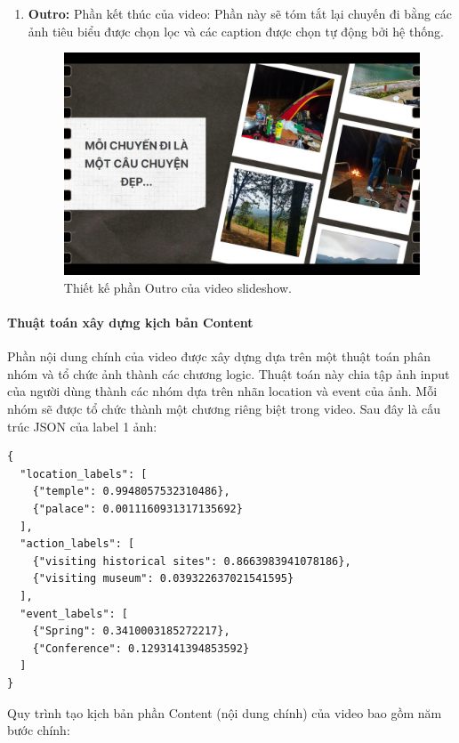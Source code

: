 \begin{enumerate}
    \item \textbf{Outro:} Phần kết thúc của video: Phần này sẽ tóm tắt lại chuyến đi bằng các ảnh tiêu biểu được chọn lọc và các caption được chọn tự động bởi hệ thống.
    
    \begin{figure}[H]
        \centering  
        \includegraphics[width=1\textwidth]{figures/c4/4_1/outro.jpg}
        \caption{Thiết kế phần Outro của video slideshow.}
        \label{fig:video-outro-design}
    \end{figure}
\end{enumerate}

\paragraph{Thuật toán xây dựng kịch bản Content}
Phần nội dung chính của video được xây dựng dựa trên một thuật toán phân nhóm và tổ chức ảnh thành các chương logic. Thuật toán này chia tập ảnh input của người dùng thành các nhóm dựa trên nhãn location và event của ảnh. Mỗi nhóm sẽ được tổ chức thành một chương riêng biệt trong video. Sau đây là cấu trúc JSON của label 1 ảnh:

\newpage
\lstset{language=json}
\begin{lstlisting}
{
  "location_labels": [
    {"temple": 0.9948057532310486},
    {"palace": 0.0011160931317135692}
  ],
  "action_labels": [
    {"visiting historical sites": 0.8663983941078186},
    {"visiting museum": 0.039322637021541595}
  ],
  "event_labels": [
    {"Spring": 0.3410003185272217},
    {"Conference": 0.1293141394853592}
  ]
}
\end{lstlisting}

Quy trình tạo kịch bản phần Content (nội dung chính) của video bao gồm năm bước chính:

